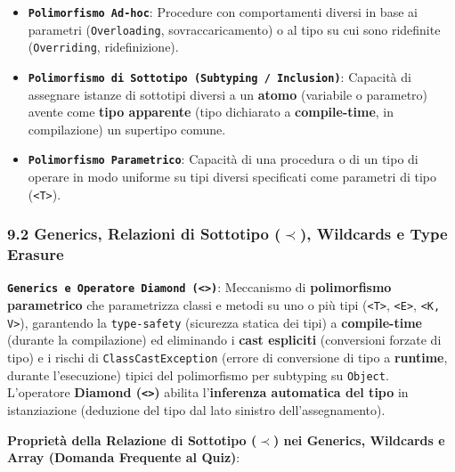 \begin{itemize}

\item \textbf{\texttt{Polimorfismo Ad-hoc}}: Procedure con comportamenti diversi in base ai parametri (\texttt{Overloading}, sovraccaricamento) o al tipo su cui sono ridefinite (\texttt{Overriding}, ridefinizione).



\item \textbf{\texttt{Polimorfismo di Sottotipo (Subtyping / Inclusion)}}: Capacità di assegnare istanze di sottotipi diversi a un \textbf{atomo} (variabile o parametro) avente come \textbf{tipo apparente} (tipo dichiarato a \textbf{compile-time}, in compilazione) un supertipo comune.



\item \textbf{\texttt{Polimorfismo Parametrico}}: Capacità di una procedura o di un tipo di operare in modo uniforme su tipi diversi specificati come parametri di tipo (\texttt{<T>}).

\end{itemize}

\subsubsection{9.2 Generics, Relazioni di Sottotipo \texorpdfstring{($\prec$)}{(sottotipo)}, Wildcards e Type Erasure}\label{9-2-generics-relazioni-di-sottotipo-prec-wildcards-e-type-erasure}

\textbf{\texttt{Generics e Operatore Diamond (<>)}}: Meccanismo di \textbf{polimorfismo parametrico} che parametrizza classi e metodi su uno o più tipi (\texttt{<T>}, \texttt{<E>}, \texttt{<K, V>}), garantendo la \texttt{type-safety} (sicurezza statica dei tipi) a \textbf{compile-time} (durante la compilazione) ed eliminando i \textbf{cast espliciti} (conversioni forzate di tipo) e i rischi di \texttt{ClassCastException} (errore di conversione di tipo a \textbf{runtime}, durante l'esecuzione) tipici del polimorfismo per subtyping su \texttt{Object}. L'operatore \textbf{Diamond (\texttt{<>})} abilita l'\textbf{inferenza automatica del tipo} in istanziazione (deduzione del tipo dal lato sinistro dell'assegnamento).

\textbf{Proprietà della Relazione di Sottotipo ($\prec$) nei Generics, Wildcards e Array (Domanda Frequente al Quiz)}:

